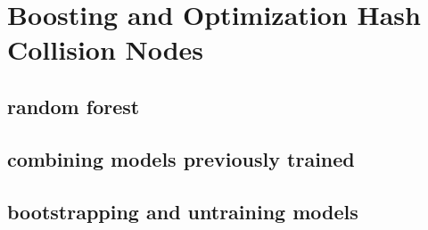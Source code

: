 \chapter{Boosting and Optimization Hash Collision Nodes}

\section{random forest}

\section{combining models previously trained}

\section{bootstrapping and untraining models}

